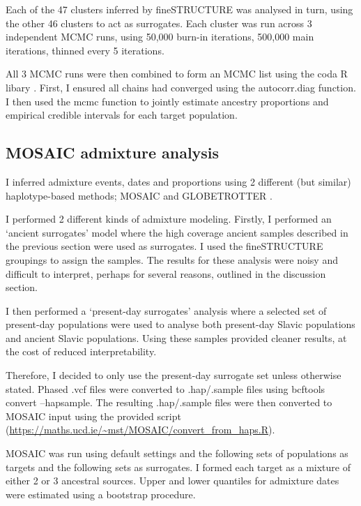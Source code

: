 Each of the 47 clusters inferred by fineSTRUCTURE was analysed in turn, using the other 46 clusters to act as surrogates. Each cluster was run across 3 independent MCMC runs, using 50,000 burn-in iterations, 500,000 main iterations, thinned every 5 iterations. 

All 3 MCMC runs were then combined to form an MCMC list using the coda R libary \cite{oro22547}. First, I ensured all chains had converged using the autocorr.diag function. I then used the mcmc function to jointly estimate ancestry proportions and empirical credible intervals for each target population. 

\subsection{MOSAIC admixture analysis}

I inferred admixture events, dates and proportions using 2 different (but similar) haplotype-based methods; MOSAIC \cite{MOSAIC_2019} and GLOBETROTTER \cite{Hellenthal2014}. 

I performed 2 different kinds of admixture modeling. Firstly, I performed an `ancient surrogates' model where the high coverage ancient samples described in the previous section were used as surrogates. I used the fineSTRUCTURE groupings to assign the samples. The results for these analysis were noisy and difficult to interpret,  perhaps for several reasons, outlined in the discussion section. 

I then performed a `present-day surrogates' analysis where a selected set of present-day populations were used to analyse both present-day Slavic populations and ancient Slavic populations. Using these samples provided cleaner results, at the cost of reduced interpretability. 

Therefore, I decided to only use the present-day surrogate set unless otherwise stated. Phased .vcf files were converted to .hap/.sample files using bcftools convert --hapsample. The resulting .hap/.sample files were then converted to MOSAIC input using the provided script (\url{https://maths.ucd.ie/~mst/MOSAIC/convert_from_haps.R}).

MOSAIC was run using default settings and the following sets of populations as targets and the following sets as surrogates. I formed each target as a mixture of either 2 or 3 ancestral sources. Upper and lower quantiles for admixture dates were estimated using a bootstrap procedure. 

